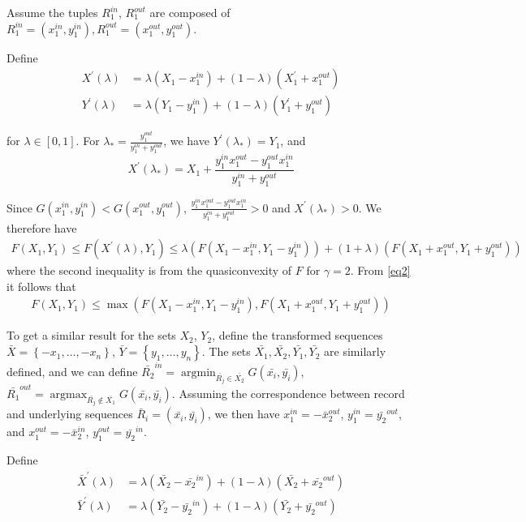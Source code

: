 \documentclass{article}
\theoremstyle{case}
\DeclareMathOperator*{\argmax}{argmax} %
\DeclareMathOperator*{\argmin}{argmin} %
\begin{document}
Assume the tuples $R_1^{in}$, $R_1^{out}$ are composed of $R_1^{in} = \left(x_1^{in}, y_1^{in}\right), R_1^{out} = \left(x_1^{out}, y_1^{out}\right)$.

Define
\begin{align*}
X^\prime\left( \lambda \right) & = \lambda \left( X_1 - x_1^{in}\right) + \left( 1 - \lambda\right) \left( X_1^\prime + x_1^{out}\right) \\
Y^\prime\left( \lambda \right) & = \lambda \left( Y_1 - y_1^{in}\right) + \left( 1 - \lambda\right) \left( Y_1^\prime + y_1^{out}\right)
\end{align*}

for $\lambda \in \left[ 0,1\right]$. For $\lambda_{*} = \frac{y_1^{out}}{y_1^{in} + y_1^{out}}$, we have $Y^\prime\left( \lambda_{*}\right) = Y_1$, and 
\[X^\prime\left( \lambda_{*}\right) = X_1 + \frac{y_1^{in}x_1^{out}-y_1^{out}x_1^{in}}{y_1^{in} + y_1^{out}}\]

Since $G(x_1^{in}, y_1^{in}) < G(x_1^{out}, y_1^{out})$, $\frac{y_1^{in}x_1^{out}-y_1^{out}x_1^{in}}{y_1^{in} + y_1^{out}} > 0$ and $X^\prime\left( \lambda_{*}\right) > 0$. We therefore have 
\begin{align} \label{eq2}
F(X_1, Y_1) \leq F(X^\prime\left( \lambda \right), Y_1) \leq \lambda\left( F(X_1-x_1^{in},Y_1-y_1^{in})\right) + \left( 1 + \lambda\right)\left( F(X_1+x_1^{out},Y_1+y_1^{out})\right)
\end{align}
where the second inequality is from the quasiconvexity of $F$ for $\gamma = 2$. From \ref{eq2} it follows that 
\begin{align} \label{eq3}
F(X_1, Y_1) \leq \max{\left(F(X_1-x_1^{in},Y_1-y_1^{in}), F(X_1+x_1^{out},Y_1+y_1^{out})\right)}
\end{align}

To get a similar result for the sets $X_2$, $Y_2$, define the transformed sequences $\bar{X} = \left\lbrace -x_1, \dots, -x_n\right\rbrace$, $\bar{Y} = \left\lbrace y_1, \dots, y_n\right\rbrace$. The sets $\bar{X_1}, \bar{X_2}, \bar{Y_1}, \bar{Y_2}$ are similarly defined, and we can define $\bar{R_2}^{in} = \argmin_{\bar{R_j} \in \bar{X_2}} G(\bar{x_i}, \bar{y_i})$, $\bar{R_1}^{out} = \argmax_{\bar{R_j} \not\in \bar{X_1}} G(\bar{x_i}, \bar{y_i})$. Assuming the correspondence between record and underlying sequences $\bar{R}_i = \left(\bar{x_i}, \bar{y_i}\right)$, we then have $x_1^{in} = -\bar{x}_2^{out}$, $y_1^{in} = \bar{y_2}^{out}$, and $x_1^{out} = -\bar{x}_2^{in}$, $y_1^{out} = \bar{y_2}^{in}$. 

Define
\begin{align*}
\bar{X}^\prime\left( \lambda \right) & = \lambda \left( \bar{X_2} - \bar{x_2}^{in}\right) + \left( 1 - \lambda\right) \left( \bar{X_2} + \bar{x_2}^{out}\right) \\
\bar{Y}^\prime\left( \lambda \right) & = \lambda \left( \bar{Y_2} - \bar{y_2}^{in}\right) + \left( 1 - \lambda\right) \left( \bar{Y_2} + \bar{y_2}^{out}\right)
\end{align*}
\end{document}
